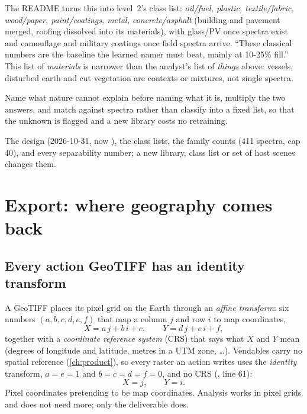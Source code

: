 The README turns this into level~2's class list: \emph{oil/fuel, plastic, textile/fabric, wood/paper,
paint/coatings, metal, concrete/asphalt} (building and pavement merged, roofing dissolved into its materials), with
glass/PV once spectra exist and camouflage and military coatings once field spectra arrive. ``These classical
numbers are the baseline the learned namer must beat, mainly at 10-25\% fill.'' This list of \emph{materials} is
narrower than the analyst's list of \emph{things} above: vessels, disturbed earth and cut vegetation are contexts
or mixtures, not single spectra.

\begin{keypoint}
Name what nature cannot explain before naming what it is, multiply the two answers, and match against spectra
rather than classify into a fixed list, so that the unknown is flagged and a new library costs no retraining.
\end{keypoint}

\begin{drift}
The design (2026-10-31, now ), the class lists, the family counts (411 spectra,
cap 40), and every separability number; a new library, class list or set of host scenes changes them.
\end{drift}

\section{Export: where geography comes back}\label{sec:material:export}

\subsection{Every action GeoTIFF has an identity transform}

A GeoTIFF places its pixel grid on the Earth through an \emph{affine transform}: six
numbers $(a,b,c,d,e,f)$ that map a column $j$ and row $i$ to map coordinates,
\begin{equation}
X=a\,j+b\,i+c,\qquad Y=d\,j+e\,i+f,
\label{eq:material:affine}
\end{equation}
together with a \emph{coordinate reference system} (CRS) that says what
$X$ and $Y$ mean (degrees of longitude and latitude, metres in a UTM zone, \dots). Vendables carry no spatial
reference (\cref{ch:product}), so every raster an action writes uses the \emph{identity} transform,
$a=e=1$ and $b=c=d=f=0$, and no CRS (, line 61):
\[
X=j,\qquad Y=i.
\]
Pixel coordinates pretending to be map coordinates. Analysis works in pixel grids and does not need more;
only the deliverable does.

